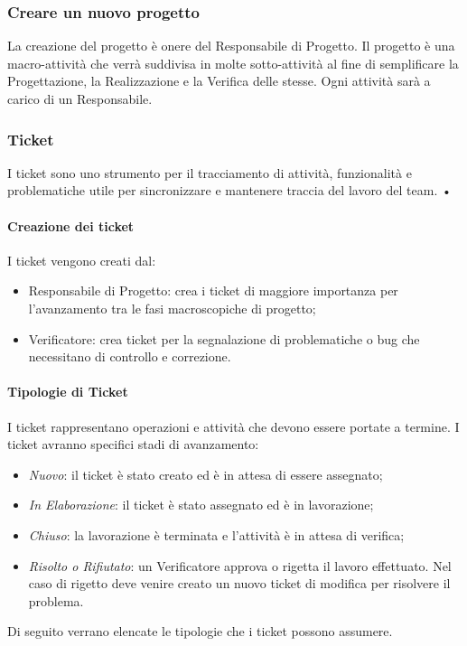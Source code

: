\subsubsection{Creare un nuovo progetto}
\label{8.1}
La creazione del progetto è onere del Responsabile di Progetto.
Il progetto è una macro-attività che verrà suddivisa in molte sotto-attività al fine di semplificare la Progettazione, la Realizzazione e la Verifica delle stesse. Ogni attività sarà a carico di un Responsabile.

\subsubsection{Ticket}
\label{8.2}
I ticket sono uno strumento per il tracciamento di attività, funzionalità e problematiche utile per sincronizzare e mantenere traccia del lavoro del team.
 •
\paragraph{Creazione dei ticket \\}
\label{8.3}
I ticket vengono creati dal:
\begin{itemize}
\item Responsabile di Progetto: crea i ticket di maggiore importanza per l'avanzamento tra le fasi macroscopiche di progetto;
\item Verificatore: crea ticket per la segnalazione di problematiche o bug che necessitano di controllo e correzione.
\end{itemize}

\paragraph{Tipologie di Ticket \\}
\label{8.4}
I ticket rappresentano operazioni e attività che devono essere portate a termine.
I ticket avranno specifici stadi di avanzamento:
\begin{itemize}
\item \emph{Nuovo}: il ticket è stato creato ed è in attesa di essere assegnato;
\item \emph{In Elaborazione}: il ticket è stato assegnato ed è in lavorazione;
\item \emph{Chiuso}: la lavorazione è terminata e l'attività è in attesa di verifica;
\item \emph{Risolto o Rifiutato}: un Verificatore approva o rigetta il lavoro effettuato. Nel caso di rigetto deve venire creato un nuovo ticket di modifica per risolvere il problema.
\end{itemize}
Di seguito verrano elencate le tipologie che i ticket possono assumere.

